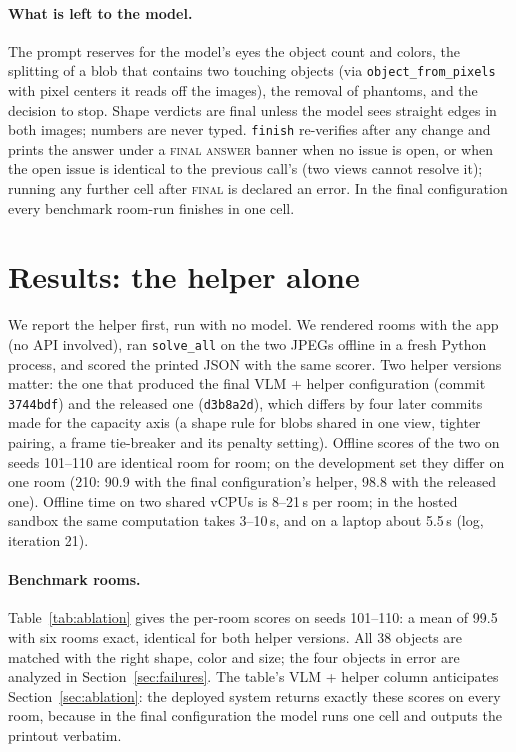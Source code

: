 \documentclass[10pt,a4paper]{article}
\begin{document}
\paragraph{What is left to the model.}
The prompt reserves for the model's eyes the object count and colors, the splitting of a blob that contains two touching objects (via \texttt{object\_from\_pixels} with pixel centers it reads off the images), the removal of phantoms, and the decision to stop. Shape verdicts are final unless the model sees straight edges in both images; numbers are never typed. \texttt{finish} re-verifies after any change and prints the answer under a \textsc{final answer} banner when no issue is open, or when the open issue is identical to the previous call's (two views cannot resolve it); running any further cell after \textsc{final} is declared an error. In the final configuration every benchmark room-run finishes in one cell.

\section{Results: the helper alone}
\label{sec:results}

We report the helper first, run with no model. We rendered rooms with the app (no API involved), ran \texttt{solve\_all} on the two JPEGs offline in a fresh Python process, and scored the printed JSON with the same scorer. Two helper versions matter: the one that produced the final VLM + helper configuration (commit \texttt{3744bdf}) and the released one (\texttt{d3b8a2d}), which differs by four later commits made for the capacity axis (a shape rule for blobs shared in one view, tighter pairing, a frame tie-breaker and its penalty setting). Offline scores of the two on seeds 101--110 are identical room for room; on the development set they differ on one room (210: 90.9 with the final configuration's helper, 98.8 with the released one). Offline time on two shared vCPUs is 8--21\,s per room; in the hosted sandbox the same computation takes 3--10\,s, and on a laptop about 5.5\,s (log, iteration 21).

\paragraph{Benchmark rooms.}
Table~\ref{tab:ablation} gives the per-room scores on seeds 101--110: a mean of 99.5 with six rooms exact, identical for both helper versions. All 38 objects are matched with the right shape, color and size; the four objects in error are analyzed in Section~\ref{sec:failures}. The table's VLM + helper column anticipates Section~\ref{sec:ablation}: the deployed system returns exactly these scores on every room, because in the final configuration the model runs one cell and outputs the printout verbatim.
\end{document}
